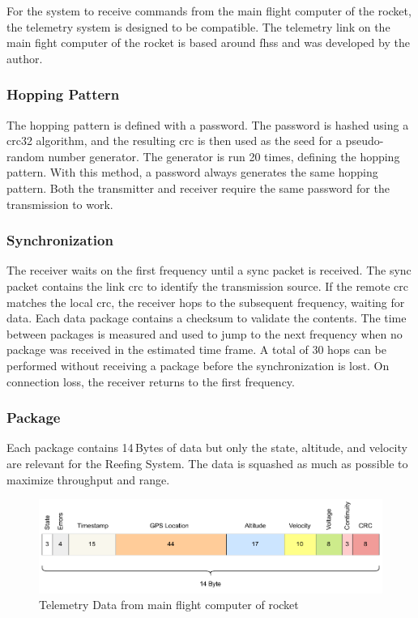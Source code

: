 For the system to receive commands from the main flight computer of the rocket, the telemetry system is designed to be compatible. The telemetry link on the main fight computer of the rocket is based around \acrlong{fhss} and was developed by the author.

\subsubsection{Hopping Pattern}
The hopping pattern is defined with a password. The password is hashed using a \acrshort{crc}32 algorithm, and the resulting \acrshort{crc} is then used as the seed for a pseudo-random number generator. The generator is run 20 times, defining the hopping pattern. With this method, a password always generates the same hopping pattern. Both the transmitter and receiver require the same password for the transmission to work.

\subsubsection{Synchronization}
The receiver waits on the first frequency until a sync packet is received. The sync packet contains the link \acrshort{crc} to identify the transmission source. If the remote \acrshort{crc} matches the local \acrshort{crc}, the receiver hops to the subsequent frequency, waiting for data. Each data package contains a checksum to validate the contents. The time between packages is measured and used to jump to the next frequency when no package was received in the estimated time frame. A total of 30 hops can be performed without receiving a package before the synchronization is lost. On connection loss, the receiver returns to the first frequency.  

\subsubsection{Package}
Each package contains 14\,Bytes of data but only the state, altitude, and velocity are relevant for the Reefing System. The data is squashed as much as possible to maximize throughput and range.

\begin{figure}[h!]
	\includegraphics[width=\textwidth]{images/package}
	\caption{Telemetry Data from main flight computer of rocket}
	\label{fig:rf-package}
\end{figure}

